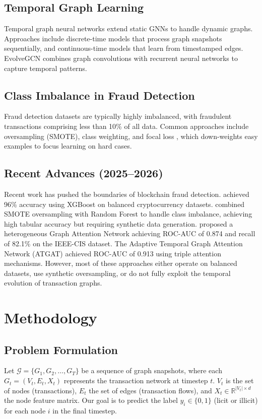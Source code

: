\documentclass[12pt,a4paper]{article}
\begin{document}
\subsection{Temporal Graph Learning}
Temporal graph neural networks extend static GNNs to handle dynamic graphs. Approaches include discrete-time models that process graph snapshots sequentially, and continuous-time models that learn from timestamped edges. EvolveGCN \citep{pareja2020evolvegcn} combines graph convolutions with recurrent neural networks to capture temporal patterns.

\subsection{Class Imbalance in Fraud Detection}
Fraud detection datasets are typically highly imbalanced, with fraudulent transactions comprising less than 10\% of all data. Common approaches include oversampling (SMOTE), class weighting, and focal loss \citep{lin2017focal}, which down-weights easy examples to focus learning on hard cases.

\subsection{Recent Advances (2025--2026)}
Recent work has pushed the boundaries of blockchain fraud detection. \citet{ertam2025} achieved 96\% accuracy using XGBoost on balanced cryptocurrency datasets. \citet{maulana2026} combined SMOTE oversampling with Random Forest to handle class imbalance, achieving high tabular accuracy but requiring synthetic data generation. \citet{olaniyi2026} proposed a heterogeneous Graph Attention Network achieving ROC-AUC of 0.874 and recall of 82.1\% on the IEEE-CIS dataset. The Adaptive Temporal Graph Attention Network (ATGAT) \citep{atgat2025} achieved ROC-AUC of 0.913 using triple attention mechanisms. However, most of these approaches either operate on balanced datasets, use synthetic oversampling, or do not fully exploit the temporal evolution of transaction graphs.

\section{Methodology}

\subsection{Problem Formulation}
Let $\mathcal{G} = \{G_1, G_2, \ldots, G_T\}$ be a sequence of graph snapshots, where each $G_t = (V_t, E_t, X_t)$ represents the transaction network at timestep $t$. $V_t$ is the set of nodes (transactions), $E_t$ the set of edges (transaction flows), and $X_t \in \mathbb{R}^{|V_t| \times d}$ the node feature matrix. Our goal is to predict the label $y_i \in \{0, 1\}$ (licit or illicit) for each node $i$ in the final timestep.
\end{document}
